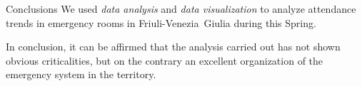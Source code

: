 \documentclass[8pt,english,aspectratio=169]{beamer}
\begin{document}
\begin{frame}{Conclusions}
We used \textit{data analysis} and \textit{data visualization} to analyze attendance trends in emergency rooms in Friuli-Venezia~Giulia during this Spring.

In conclusion, it can be affirmed that the analysis carried out has not shown obvious criticalities, but on the contrary an excellent organization of the emergency system in the territory.


\end{frame}
\end{document}
